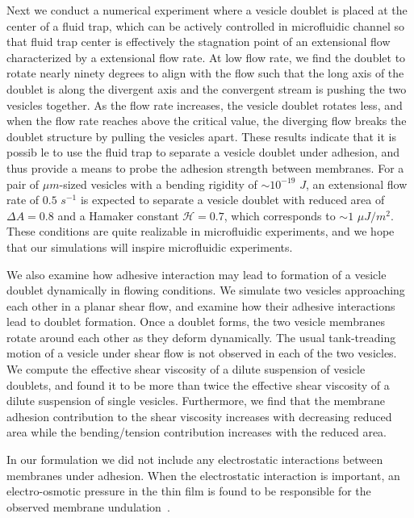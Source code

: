 \documentclass[prf,superscriptaddress,showpacs]{revtex4-1}
\begin{document}
Next we conduct a numerical experiment where a vesicle doublet is placed
at the center of a fluid trap, which can be actively controlled in
microfluidic channel so that fluid trap center is effectively the
stagnation point of an extensional flow characterized by a extensional
flow rate.  At low flow rate, we find the doublet to rotate nearly ninety
degrees to align with the flow such that the long axis of the doublet is
along the divergent axis and the convergent stream is pushing the two
vesicles together. As the flow rate increases, the vesicle doublet
rotates less, and when the flow rate reaches above the critical value,
the diverging flow breaks the doublet structure by pulling the vesicles
apart.  These results indicate that it is possib le to use the fluid trap
to separate a vesicle doublet under adhesion, and thus provide a means
to probe the adhesion strength between membranes.  For a pair of $\mu
m$-sized vesicles with a bending rigidity of $\sim 10^{-19}$ $J$, an
extensional flow rate of $0.5$ $s^{-1}$ is expected to separate a
vesicle doublet with reduced area of $\Delta A = 0.8$ and a Hamaker
constant $\mathcal{H}=0.7$, which corresponds to $\sim 1$ $\mu J/m^2$.
These conditions are quite realizable in microfluidic experiments, and
we hope that our simulations will inspire microfluidic experiments.

We also examine how adhesive interaction may lead to formation of a
vesicle doublet dynamically in flowing conditions.  We simulate two
vesicles approaching each other in a planar shear flow, and examine how
their adhesive interactions lead to doublet formation.  Once a doublet
forms, the two vesicle membranes rotate around each other as they deform
dynamically. The usual tank-treading motion of a vesicle under shear
flow is not observed in each of the two vesicles. We compute the
effective shear viscosity of a dilute suspension of vesicle doublets,
and found it to be more than twice the effective shear viscosity of a
dilute suspension of single vesicles.  Furthermore, we find that the
membrane adhesion contribution to the shear viscosity increases with
decreasing reduced area while the bending/tension contribution increases
with the reduced area.

In our formulation we did not include any electrostatic interactions
between membranes under adhesion. When the electrostatic interaction is
important, an electro-osmotic pressure in the thin film is found to be
responsible for the observed membrane
undulation~\cite{SteinkuhlerAgudo-Canalejo2016_BJ}.
\end{document}
